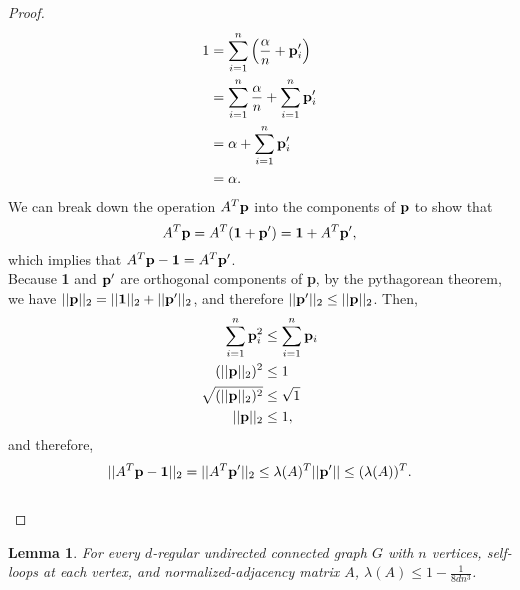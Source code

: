 \documentclass[psamsfonts, 10pt]{amsart}
\newtheorem{lem}[thm]{Lemma}
\theoremstyle{definition}
\theoremstyle{remark}
\numberwithin{equation}{section}
\begin{document}
\begin{proof}
\[
\begin{aligned}
1 &= \sum_{i = 1}^n \Big(\frac{\alpha}{n} + {\bf p}'_i \Big)\\
&=  \sum_{i = 1}^n \frac{\alpha}{n} + \sum_{i=1}^n {\bf p}'_i\\
&=  \alpha + \sum_{i=1}^n {\bf p}'_i\\
&= \alpha.\\
 \end{aligned}
\]
We can break down the operation $A^T{\bf p}$ into the components of ${\bf p}$ to show that
\[
A^T{\bf p} = A^T({\bf 1} + {\bf p}') = {\bf 1} + A^T{\bf p}',
\]
which implies that $A^T{\bf p} - {\bf 1} = A^T{\bf p}'$.\\

Because {\bf 1} and ${\bf p}'$ are orthogonal components of {\bf p}, by the pythagorean theorem, we have $\lvert \lvert {\bf p} \rvert \rvert_2 = \lvert \lvert {\bf 1 }\rvert \rvert_2 + \lvert \lvert {\bf p}'\rvert \rvert_2$, and therefore $\lvert \lvert {\bf p}' \rvert \rvert_2 \leq \lvert \lvert {\bf p} \rvert \rvert_2$. Then,
\[
\begin{aligned}
\sum_{i=1}^{n} {\bf p}_i^2 &\leq \sum_{i=1}^{n}{\bf p}_i\\
(\lvert\lvert {\bf p} \rvert \rvert_2)^2 &\leq 1\\ 
\sqrt{(\lvert\lvert {\bf p} \rvert \rvert_2)^2} &\leq \sqrt{1}\\
\lvert\lvert {\bf p} \rvert \rvert_2 &\leq  1,
\end{aligned}
\]
and therefore,
\[
\begin{aligned}
\lvert \lvert A^T{\bf p} - {\bf 1} \rvert \rvert_2 = \lvert \lvert A^T{\bf p}' \rvert \rvert_2 \leq \lambda(A)^T\lvert\lvert {\bf p}' \rvert \rvert \leq (\lambda(A))^T.
\end{aligned}
\]
\\
\end{proof}
\begin{lem}
For every $d$-regular undirected connected graph $G$ with $n$ vertices, self-loops at each vertex, and normalized-adjacency matrix $A$,  $\lambda(A) \leq 1-\frac{1}{8dn^3}$.
\end{lem}
\end{document}
